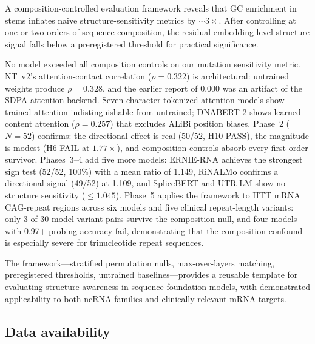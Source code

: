 \documentclass[11pt]{article}
\begin{document}
A composition-controlled evaluation framework reveals that GC
enrichment in stems inflates naive structure-sensitivity metrics by
${\sim}3\times$.  After controlling at one or two orders of sequence
composition, the residual embedding-level structure signal falls below
a preregistered threshold for practical significance.

No model exceeded all composition controls on our mutation sensitivity
metric.  NT~v2's attention-contact
correlation ($\rho = 0.322$) is architectural: untrained weights
produce $\rho = 0.328$, and the earlier report of $0.000$ was an
artifact of the SDPA attention backend.  Seven character-tokenized
attention models show trained attention indistinguishable from
untrained; DNABERT-2 shows learned content attention ($\rho = 0.257$)
that excludes ALiBi position biases.  Phase~2 ($N = 52$) confirms:
the directional effect is real (50/52, H10 PASS), the magnitude is
modest (H6 FAIL at $1.77\times$), and composition controls absorb
every first-order survivor.  Phases~3--4 add five more models:
ERNIE-RNA achieves the strongest sign test (52/52, 100\%) with a mean
ratio of 1.149, RiNALMo confirms a directional signal (49/52) at
1.109, and SpliceBERT and UTR-LM show no structure sensitivity
($\leq 1.045$).  Phase~5 applies the framework to HTT mRNA
CAG-repeat regions across six models and five clinical repeat-length
variants: only 3 of 30 model-variant pairs survive the composition
null, and four models with 0.97+ probing accuracy fail, demonstrating
that the composition confound is especially severe for trinucleotide
repeat sequences.

The framework---stratified permutation nulls, max-over-layers
matching, preregistered thresholds, untrained baselines---provides a
reusable template for evaluating structure awareness in sequence
foundation models, with demonstrated applicability to both ncRNA
families and clinically relevant mRNA targets.

\subsection*{Data availability}
\end{document}

